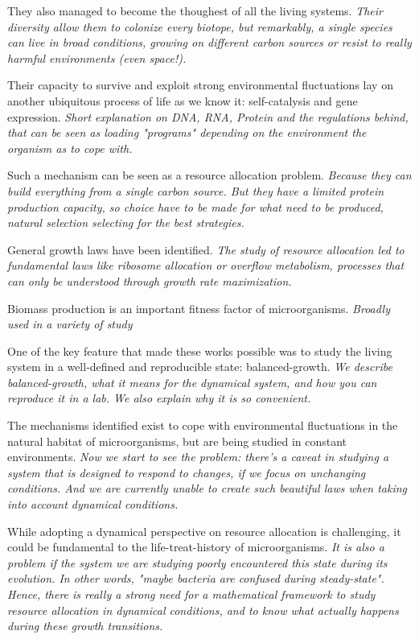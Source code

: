 They also managed to become the thoughest of all the living systems.
\textit{Their diversity allow them to colonize every biotope, but remarkably, a single species can live in broad conditions, growing on different carbon sources or resist to really harmful environments (even space!).
}

Their capacity to survive and exploit strong environmental fluctuations lay on another ubiquitous process of life as we know it: self-catalysis and gene expression.
\textit{Short explanation on DNA, RNA, Protein and the regulations behind, that can be seen as loading "programs" depending on the environment the organism as to cope with.}

Such a mechanism can be seen as a resource allocation problem.
\textit{Because they can build everything from a single carbon source.
But they have a limited protein production capacity, so choice have to be made for what need to be produced, natural selection selecting for the best strategies.}

General growth laws have been identified.
\textit{The study of resource allocation led to fundamental laws like ribosome allocation or overflow metabolism, processes that can only be understood through growth rate maximization.}

Biomass production is an important fitness factor of microorganisms.
\textit{Broadly used in a variety of study}

One of the key feature that made these works possible was to study the living system in a well-defined and reproducible state: balanced-growth.
\textit{We describe balanced-growth, what it means for the dynamical system, and how you can reproduce it in a lab.
We also explain why it is so convenient.}

The mechanisms identified exist to cope with environmental fluctuations in the natural habitat of microorganisms, but are being studied in constant environments.
\textit{Now we start to see the problem: there's a caveat in studying a system that is designed to respond to changes, if we focus on unchanging conditions.
And we are currently unable to create such beautiful laws when taking into account dynamical conditions.}

While adopting a dynamical perspective on resource allocation is challenging, it could be fundamental to the life-treat-history of microorganisms.
\textit{It is also a problem if the system we are studying poorly encountered this state during its evolution.
In other words, "maybe bacteria are confused during steady-state".
Hence, there is really a strong need for a mathematical framework to study resource allocation in dynamical conditions, and to know what actually happens during these growth transitions.}

